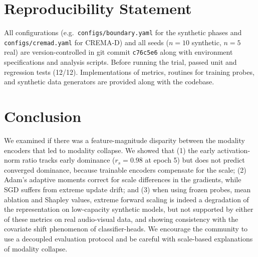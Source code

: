 \documentclass[conference]{IEEEtran}
\begin{document}
\section{Reproducibility Statement}
All configurations (e.g.\ \texttt{configs/boundary.yaml} for the synthetic phases and \texttt{configs/cremad.yaml} for CREMA-D) and all seeds ($n=10$ synthetic, $n=5$ real) are version-controlled in git commit \texttt{c76c5e6} along with environment specifications and analysis scripts. Before running the trial, passed unit and regression tests (12/12). Implementations of metrics, routines for training probes, and synthetic data generators are provided along with the codebase.

\section{Conclusion}
We examined if there was a feature-magnitude disparity between the modality encoders that led to modality collapse. %
We showed that (1) the early activation-norm ratio tracks early dominance ($r_s = 0.98$ at epoch 5) but does not predict converged dominance, because trainable encoders compensate for the scale; (2) Adam's adaptive moments correct for scale differences in the gradients, while SGD suffers from extreme update drift; and (3) when using frozen probes, mean ablation and Shapley values, extreme forward scaling is indeed a degradation of the representation on low-capacity synthetic models, but not supported by either of these metrics on real audio-visual data, and showing consistency with the covariate shift phenomenon of classifier-heads. We encourage the community to use a decoupled evaluation protocol and be careful with scale-based explanations of modality collapse.
\end{document}
